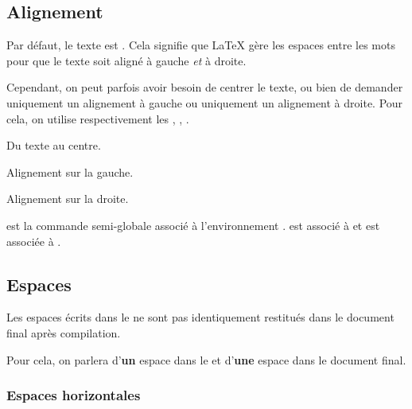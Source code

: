 \documentclass[10pt,french]{book}
\begin{document}
\subsection{Alignement}

Par défaut, le texte est . Cela signifie que \LaTeX{} gère les espaces entre les mots pour que le texte soit aligné à gauche \textit{et} à droite.\par
Cependant, on peut parfois avoir besoin de centrer le texte, ou bien de demander uniquement un alignement à gauche ou uniquement un alignement à droite. Pour cela, on utilise respectivement les  , , .\bigskip

{\NewFont
\begin{SideBySideExample}
    \begin{center}
    Du texte au centre.
    \end{center}
    \begin{flushleft}
    Alignement sur la gauche.
    \end{flushleft}
    \begin{flushright}
    Alignement sur la droite.
    \end{flushright}
\end{SideBySideExample}
}

\begin{info}
     est la commande semi-globale associé à l'environnement .  est associé à  et  est associée à .
\end{info}

\subsection{Espaces}

\begin{info}
    Les espaces écrits dans le  ne sont pas identiquement restitués dans le document final après compilation.\par
    Pour cela, on parlera d'\textbf{un} espace dans le  et d'\textbf{une} espace dans le document final.
\end{info}

\subsubsection{Espaces horizontales}
\end{document}

